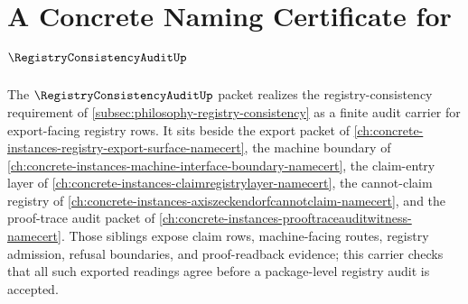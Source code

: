 \chapter{A Concrete Naming Certificate for $\RegistryConsistencyAuditUp$}
\label{ch:concrete-instances-registry-consistency-audit-namecert}

The $\RegistryConsistencyAuditUp$ packet realizes the registry-consistency requirement of \autoref{subsec:philosophy-registry-consistency} as a finite audit carrier for export-facing registry rows. It sits beside the export packet of \autoref{ch:concrete-instances-registry-export-surface-namecert}, the machine boundary of \autoref{ch:concrete-instances-machine-interface-boundary-namecert}, the claim-entry layer of \autoref{ch:concrete-instances-claimregistrylayer-namecert}, the cannot-claim registry of \autoref{ch:concrete-instances-axiszeckendorfcannotclaim-namecert}, and the proof-trace audit packet of \autoref{ch:concrete-instances-prooftraceauditwitness-namecert}. Those siblings expose claim rows, machine-facing routes, registry admission, refusal boundaries, and proof-readback evidence; this carrier checks that all such exported readings agree before a package-level registry audit is accepted.


